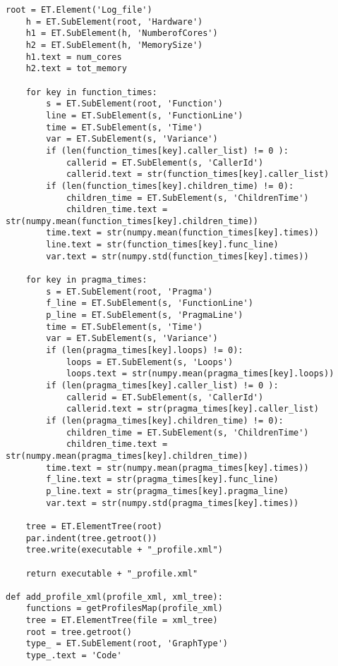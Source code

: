 \documentclass[a4paper,10pt,twoside]{book}
\begin{document}
\begin{lstlisting}[language=CCC, caption=profiler.py]
	root = ET.Element('Log_file')
	h = ET.SubElement(root, 'Hardware')
	h1 = ET.SubElement(h, 'NumberofCores')
	h2 = ET.SubElement(h, 'MemorySize')
	h1.text = num_cores
	h2.text = tot_memory

	for key in function_times:
		s = ET.SubElement(root, 'Function')
		line = ET.SubElement(s, 'FunctionLine')
		time = ET.SubElement(s, 'Time')
		var = ET.SubElement(s, 'Variance')
		if (len(function_times[key].caller_list) != 0 ):
			callerid = ET.SubElement(s, 'CallerId')
			callerid.text = str(function_times[key].caller_list)
		if (len(function_times[key].children_time) != 0):
			children_time = ET.SubElement(s, 'ChildrenTime')
			children_time.text = str(numpy.mean(function_times[key].children_time))
		time.text = str(numpy.mean(function_times[key].times))
		line.text = str(function_times[key].func_line)
		var.text = str(numpy.std(function_times[key].times))

	for key in pragma_times:
		s = ET.SubElement(root, 'Pragma')
		f_line = ET.SubElement(s, 'FunctionLine')
		p_line = ET.SubElement(s, 'PragmaLine')
		time = ET.SubElement(s, 'Time')
		var = ET.SubElement(s, 'Variance')
		if (len(pragma_times[key].loops) != 0):
			loops = ET.SubElement(s, 'Loops')
			loops.text = str(numpy.mean(pragma_times[key].loops))
		if (len(pragma_times[key].caller_list) != 0 ):
			callerid = ET.SubElement(s, 'CallerId')
			callerid.text = str(pragma_times[key].caller_list)
		if (len(pragma_times[key].children_time) != 0):
			children_time = ET.SubElement(s, 'ChildrenTime')
			children_time.text = str(numpy.mean(pragma_times[key].children_time))
		time.text = str(numpy.mean(pragma_times[key].times))
		f_line.text = str(pragma_times[key].func_line)
		p_line.text = str(pragma_times[key].pragma_line)
		var.text = str(numpy.std(pragma_times[key].times))

	tree = ET.ElementTree(root)
	par.indent(tree.getroot())
	tree.write(executable + "_profile.xml")

	return executable + "_profile.xml"

def add_profile_xml(profile_xml, xml_tree):
	functions = getProfilesMap(profile_xml)
	tree = ET.ElementTree(file = xml_tree) 
	root = tree.getroot()
	type_ = ET.SubElement(root, 'GraphType')
	type_.text = 'Code'


\end{lstlisting}
\end{document}
